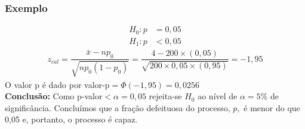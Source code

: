\documentclass[14pt,aspectratio=1610]{beamer}
\newcommand{\bx}{\ensuremath{\bar{x}}}
\newcommand{\Ho}{\ensuremath{H_{0}}}
\begin{document}
\begin{frame}{}
\frametitle{Exemplo}
\begin{block}{}
\justifying
\begin{align*}
H_{0}: p&=0,05 \\ 
H_{1}: p&<0,05
\end{align*}
\begin{align}
z_{cal}=\dfrac{\bx-np_{0}}{\sqrt{np_{0}(1 - p_{0})}}=\dfrac{4-200\times(0,05)}{\sqrt{200\times0,05\times(0,95)}}=-1,95
\end{align}
O valor p é dado por valor-p$=\Phi(-1,95)=0,0256$\\
\textbf{Conclusão:} Como p-valor$<\alpha=0,05$ rejeita-se $\Ho$ ao nível de $\alpha=5\%$ de significância. Concluímos que a fração defeituosa do processo, $p,$ é 
menor do que 0,05 e, portanto, o processo é capaz.
\end{block}
\end{frame}
\end{document}
